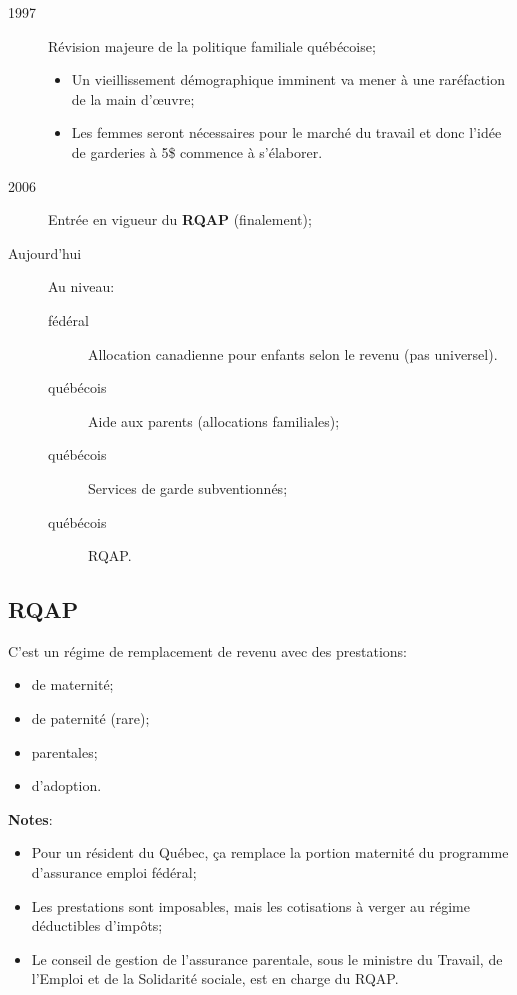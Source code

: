 \documentclass[10pt, french]{article}
\begin{document}
\begin{multicols*}{3}
\begin{description}
	\item[1997]	Révision majeure de la politique familiale \textcolor{blue(pigment)}{québécoise};
		\begin{itemize}[leftmargin = *]
		\item	Un vieillissement démographique imminent va mener à une raréfaction de la main d'œuvre;
		\item	Les femmes seront nécessaires pour le marché du travail et donc l'idée de garderies à 5\$ commence à s'élaborer.
		\end{itemize}
	\item[2006]	Entrée en vigueur du \textbf{\textcolor{blue(pigment)}{RQAP}} (finalement);
	\item[Aujourd'hui]	Au niveau:
		\begin{description}
		\item[\textcolor{bulgarianrose}{fédéral}]	Allocation canadienne pour enfants selon le revenu (pas universel).
		\item[\textcolor{blue(pigment)}{québécois}]	Aide aux parents (allocations familiales);
		\item[\textcolor{blue(pigment)}{québécois}]	Services de garde subventionnés;
		\item[\textcolor{blue(pigment)}{québécois}]	RQAP.
		\end{description}
\end{description}


\columnbreak
\subsection{RQAP}

C'est un régime de remplacement de revenu avec des prestations:
\begin{multicols*}{2}
\begin{itemize}[leftmargin = *]
\item	de maternité;
\item	de paternité (rare);
\item	parentales;
\item	d'adoption.
\end{itemize}
\end{multicols*}

\textbf{Notes}:
\begin{itemize}[leftmargin = *]
	\item	Pour un résident du \textcolor{blue(pigment)}{Québec}, ça remplace la portion maternité du programme d'assurance emploi \textcolor{bulgarianrose}{fédéral};
	\item	Les prestations sont imposables, mais les cotisations à verger au régime déductibles d'impôts;
	\item	Le conseil de gestion de l'assurance parentale, sous le ministre du Travail, de l'Emploi et de la Solidarité sociale, est en charge du RQAP.
\end{itemize}


\end{multicols*}
\end{document}
